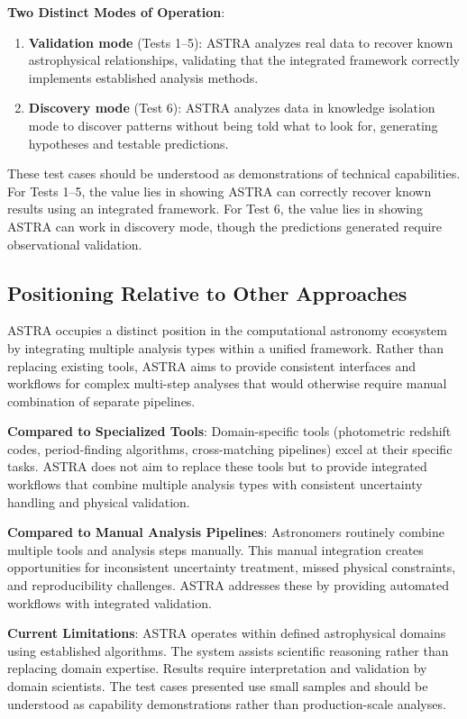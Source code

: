 \documentclass[usenatbib]{rasti}
\begin{document}
\textbf{Two Distinct Modes of Operation}:
\begin{enumerate}
\item \textbf{Validation mode} (Tests 1--5): ASTRA analyzes real data to recover known astrophysical relationships, validating that the integrated framework correctly implements established analysis methods.
\item \textbf{Discovery mode} (Test 6): ASTRA analyzes data in knowledge isolation mode to discover patterns without being told what to look for, generating hypotheses and testable predictions.
\end{enumerate}

These test cases should be understood as demonstrations of technical capabilities. For Tests 1--5, the value lies in showing ASTRA can correctly recover known results using an integrated framework. For Test 6, the value lies in showing ASTRA can work in discovery mode, though the predictions generated require observational validation.

\subsection{Positioning Relative to Other Approaches}

ASTRA occupies a distinct position in the computational astronomy ecosystem by integrating multiple analysis types within a unified framework. Rather than replacing existing tools, ASTRA aims to provide consistent interfaces and workflows for complex multi-step analyses that would otherwise require manual combination of separate pipelines.

\textbf{Compared to Specialized Tools}: Domain-specific tools (photometric redshift codes, period-finding algorithms, cross-matching pipelines) excel at their specific tasks. ASTRA does not aim to replace these tools but to provide integrated workflows that combine multiple analysis types with consistent uncertainty handling and physical validation.

\textbf{Compared to Manual Analysis Pipelines}: Astronomers routinely combine multiple tools and analysis steps manually. This manual integration creates opportunities for inconsistent uncertainty treatment, missed physical constraints, and reproducibility challenges. ASTRA addresses these by providing automated workflows with integrated validation.

\textbf{Current Limitations}: ASTRA operates within defined astrophysical domains using established algorithms. The system assists scientific reasoning rather than replacing domain expertise. Results require interpretation and validation by domain scientists. The test cases presented use small samples and should be understood as capability demonstrations rather than production-scale analyses.
\end{document}
